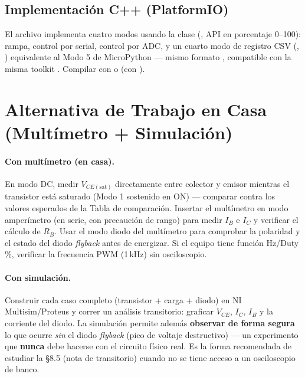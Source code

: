 \documentclass[11pt]{article}
\begin{document}
\subsection{Implementación C++ (PlatformIO)}
El archivo  implementa cuatro modos usando la clase
 (, API en porcentaje 0--100):
rampa, control por serial, control por ADC, y un cuarto modo de registro CSV
(, ) equivalente al Modo 5 de
MicroPython — mismo formato , compatible con la
misma toolkit . Compilar con  o  (con ).

\section{Alternativa de Trabajo en Casa (Multímetro + Simulación)}
\label{sec:casa}

\paragraph{Con multímetro (en casa).} En modo DC, medir $V_{CE(\text{sat})}$ directamente
entre colector y emisor mientras el transistor está saturado (Modo 1 sostenido en ON) —
comparar contra los valores esperados de la Tabla de comparación. Insertar el multímetro
en modo amperímetro (en serie, con precaución de rango) para medir $I_B$ e $I_C$ y
verificar el cálculo de $R_B$. Usar el modo diodo del multímetro para comprobar la
polaridad y el estado del diodo \emph{flyback} antes de energizar. Si el equipo tiene
función Hz/Duty\,\%, verificar la frecuencia PWM (1\,kHz) sin osciloscopio.

\paragraph{Con simulación.} Construir cada caso completo (transistor + carga + diodo) en
NI Multisim/Proteus y correr un análisis transitorio: graficar $V_{CE}$, $I_C$, $I_B$ y
la corriente del diodo. La simulación permite además \textbf{observar de forma segura} lo
que ocurre \emph{sin} el diodo \emph{flyback} (pico de voltaje destructivo) — un
experimento que \textbf{nunca} debe hacerse con el circuito físico real. Es la forma
recomendada de estudiar la \S8.5 (nota de transitorio) cuando no se tiene acceso a un
osciloscopio de banco.
\end{document}
